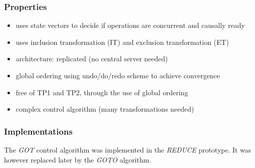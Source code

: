 \subsubsection{Properties}
\begin{itemize}
 \item uses state vectors to decide if operations are concurrent and 
       causally ready
 \item uses inclusion transformation (IT) and exclusion transformation (ET)
 \item architecture: replicated (no central server needed)
 \item global ordering using undo/do/redo scheme to achieve convergence
 \item free of TP1 and TP2, through the use of global ordering
 \item complex control algorithm (many transformations needed)
\end{itemize}


\subsubsection{Implementations}
The \emph{GOT} control algorithm was implemented in the \emph{REDUCE} prototype. It was however replaced later by the \emph{GOTO} algorithm.


